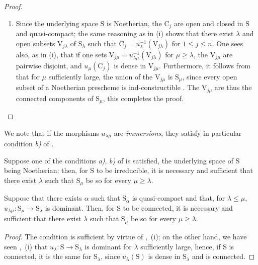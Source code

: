 \begin{proof}
\begin{enumerate}[label=(\roman*)]
  \item Since the underlying space $\mathrm{S}$ is Noetherian, the $\mathrm{C}_j$ are open and closed in $\mathrm{S}$ and quasi-compact; the same reasoning as in (i) shows that there exist $\lambda$ and open subsets $\mathrm{V}_{j\lambda}$ of $\mathrm{S}_\lambda$ such that $\mathrm{C}_j=u_\lambda^{-1}(\mathrm{V}_{j\lambda})$ for $1\leqslant j\leqslant n$.
One sees also, as in (i), that if one sets $\mathrm{V}_{j\mu}=u_{\lambda\mu}^{-1}(\mathrm{V}_{j\lambda})$ for $\mu\geqslant\lambda$, the $\mathrm{V}_{j\mu}$ are pairwise disjoint, and $u_\mu(\mathrm{C}_j)$ is dense in $\mathrm{V}_{j\mu}$.
Furthermore, it follows from  that for $\mu$ sufficiently large, the union of the $\mathrm{V}_{j\mu}$ is $\mathrm{S}_\mu$, since every open subset of a Noetherian prescheme is ind-constructible .
The $\mathrm{V}_{j\mu}$ are thus the connected components of $\mathrm{S}_\mu$, this completes the proof.
\end{enumerate}
\end{proof}

We note that if the morphisms $u_{\lambda\mu}$ are \emph{immersions}, they satisfy in particular condition \emph{b)} of .

\begin{corollary}[8.4.3]
\label{IV.8.4.3}
Suppose one of the conditions \emph{a)}, \emph{b)} of  is satisfied, the underlying space of $\mathrm{S}$ being Noetherian; then, for $\mathrm{S}$ to be irreducible, it is necessary and sufficient that there exist $\lambda$ such that $\mathrm{S}_\mu$ be so for every $\mu\geqslant\lambda$.
\end{corollary}

\begin{proposition}[8.4.4]
\label{IV.8.4.4}
Suppose that there exists $\alpha$ such that $\mathrm{S}_\alpha$ is quasi-compact and that, for $\lambda\leqslant\mu$, $u_{\lambda\mu}:\mathrm{S}_\mu\to\mathrm{S}_\lambda$ is dominant.
Then, for $\mathrm{S}$ to be connected, it is necessary and sufficient that there exist $\lambda$ such that $\mathrm{S}_\mu$ be so for every $\mu\geqslant\lambda$.
\end{proposition}

\begin{proof}
The condition is sufficient by virtue of ,~(i); on the other hand, we have seen ,~(i) that $u_\lambda:\mathrm{S}\to\mathrm{S}_\lambda$ is dominant for $\lambda$ sufficiently large, hence, if $\mathrm{S}$ is connected, it is the same for $\mathrm{S}_\lambda$, since $u_\lambda(\mathrm{S})$ is dense in $\mathrm{S}_\lambda$ and is connected.
\end{proof}

